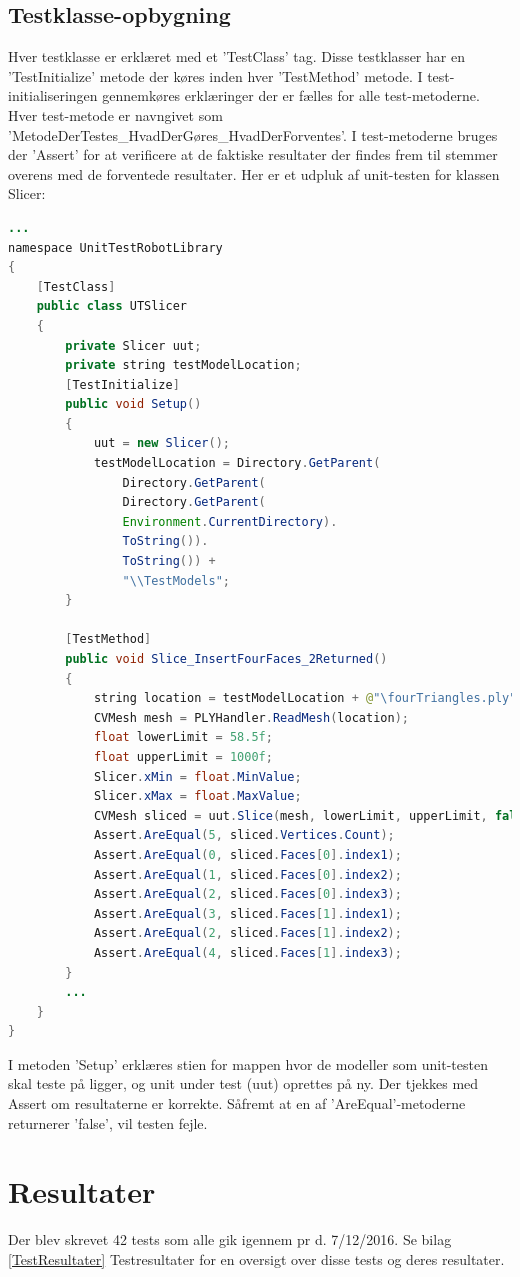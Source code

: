 \newpage
\subsection{Testklasse-opbygning}
Hver testklasse er erklæret med et 'TestClass' tag. Disse testklasser har en 'TestInitialize' metode der køres inden hver 'TestMethod' metode. I test-initialiseringen gennemkøres erklæringer der er fælles for alle test-metoderne. Hver test-metode er navngivet som 'MetodeDerTestes\_HvadDerGøres\_HvadDerForventes'. I test-metoderne bruges der 'Assert' for at verificere at de faktiske resultater der findes frem til stemmer overens med de forventede resultater. Her er et udpluk af unit-testen for klassen Slicer:

\begin{lstlisting}[language=Java]
...
namespace UnitTestRobotLibrary
{
	[TestClass]
	public class UTSlicer
	{
		private Slicer uut;
		private string testModelLocation;
		[TestInitialize]
		public void Setup()
		{
			uut = new Slicer();
			testModelLocation = Directory.GetParent(
				Directory.GetParent(
				Directory.GetParent(
				Environment.CurrentDirectory).
				ToString()).
				ToString()) +
				"\\TestModels";
		}

		[TestMethod]
		public void Slice_InsertFourFaces_2Returned()
		{
			string location = testModelLocation + @"\fourTriangles.ply";
			CVMesh mesh = PLYHandler.ReadMesh(location);
			float lowerLimit = 58.5f;
			float upperLimit = 1000f;
			Slicer.xMin = float.MinValue;
			Slicer.xMax = float.MaxValue;
			CVMesh sliced = uut.Slice(mesh, lowerLimit, upperLimit, false);
			Assert.AreEqual(5, sliced.Vertices.Count);
			Assert.AreEqual(0, sliced.Faces[0].index1);
			Assert.AreEqual(1, sliced.Faces[0].index2);
			Assert.AreEqual(2, sliced.Faces[0].index3);
			Assert.AreEqual(3, sliced.Faces[1].index1);
			Assert.AreEqual(2, sliced.Faces[1].index2);
			Assert.AreEqual(4, sliced.Faces[1].index3);
		}
		...
	}
}
\end{lstlisting}
I metoden 'Setup' erklæres stien for mappen hvor de modeller som unit-testen skal teste på ligger, og unit under test (uut) oprettes på ny. Der tjekkes med Assert om resultaterne er korrekte. Såfremt at en af 'AreEqual'-metoderne returnerer 'false', vil testen fejle.
\newpage
\section{Resultater}
Der blev skrevet 42 tests som alle gik igennem pr d. 7/12/2016.
Se bilag \ref{TestResultater} Testresultater for en oversigt over disse tests og deres resultater.

